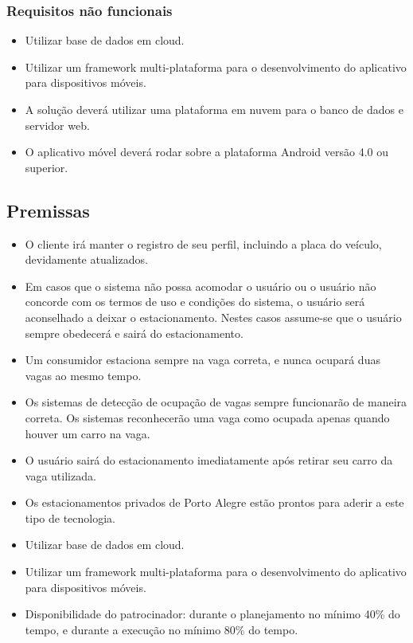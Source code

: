 \subsubsection{Requisitos não funcionais}

\begin{itemize}
	\item Utilizar base de dados em cloud.
	\item Utilizar um framework multi-plataforma para o desenvolvimento do aplicativo para dispositivos móveis.
	\item A solução deverá utilizar uma plataforma em nuvem para o banco de dados e servidor web.
	\item O aplicativo móvel deverá rodar sobre a plataforma Android versão 4.0 ou superior.
\end{itemize}

\subsection{Premissas}

\begin{itemize}
	\item O cliente irá manter o registro de seu perfil, incluindo a placa do veículo, devidamente atualizados.
    \item Em casos que o sistema não possa acomodar o usuário ou o usuário não concorde com os termos de uso e condições do sistema, o usuário será aconselhado a deixar o estacionamento. Nestes casos assume-se que o usuário sempre obedecerá e sairá do estacionamento.
    \item Um consumidor estaciona sempre na vaga correta, e nunca ocupará duas vagas ao mesmo tempo.
    \item Os sistemas de detecção de ocupação de vagas sempre funcionarão de maneira correta. Os sistemas reconhecerão uma vaga como ocupada apenas quando houver um carro na vaga.
    \item O usuário sairá do estacionamento imediatamente após retirar seu carro da vaga utilizada.
	\item Os estacionamentos privados de Porto Alegre estão prontos para aderir a este tipo de tecnologia.
	\item Utilizar base de dados em cloud.
	\item Utilizar um framework multi-plataforma para o desenvolvimento do aplicativo para dispositivos móveis.
	\item Disponibilidade do patrocinador: durante o planejamento no mínimo 40\% do tempo, e durante a execução no mínimo 80\% do tempo.
\end{itemize}

